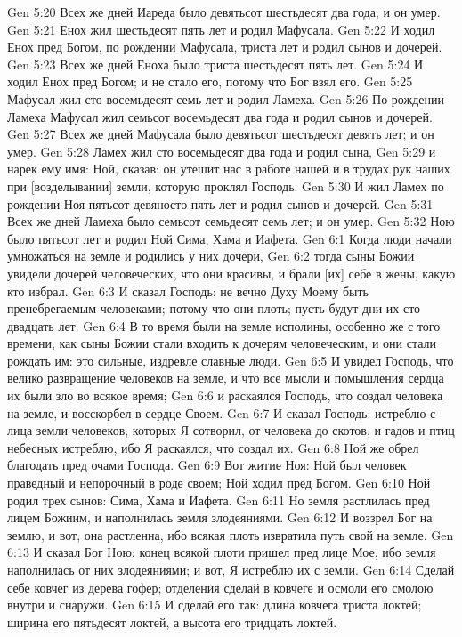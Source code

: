 Gen 5:20  Всех же дней Иареда было девятьсот шестьдесят два года; и он умер.
Gen 5:21  Енох жил шестьдесят пять лет и родил Мафусала.
Gen 5:22  И ходил Енох пред Богом, по рождении Мафусала, триста лет и родил сынов и дочерей.
Gen 5:23  Всех же дней Еноха было триста шестьдесят пять лет.
Gen 5:24  И ходил Енох пред Богом; и не стало его, потому что Бог взял его.
Gen 5:25  Мафусал жил сто восемьдесят семь лет и родил Ламеха.
Gen 5:26  По рождении Ламеха Мафусал жил семьсот восемьдесят два года и родил сынов и дочерей.
Gen 5:27  Всех же дней Мафусала было девятьсот шестьдесят девять лет; и он умер.
Gen 5:28  Ламех жил сто восемьдесят два года и родил сына,
Gen 5:29  и нарек ему имя: Ной, сказав: он утешит нас в работе нашей и в трудах рук наших при [возделывании] земли, которую проклял Господь.
Gen 5:30  И жил Ламех по рождении Ноя пятьсот девяносто пять лет и родил сынов и дочерей.
Gen 5:31  Всех же дней Ламеха было семьсот семьдесят семь лет; и он умер.
Gen 5:32  Ною было пятьсот лет и родил Ной Сима, Хама и Иафета.
Gen 6:1  Когда люди начали умножаться на земле и родились у них дочери,
Gen 6:2  тогда сыны Божии увидели дочерей человеческих, что они красивы, и брали [их] себе в жены, какую кто избрал.
Gen 6:3  И сказал Господь: не вечно Духу Моему быть пренебрегаемым человеками; потому что они плоть; пусть будут дни их сто двадцать лет.
Gen 6:4  В то время были на земле исполины, особенно же с того времени, как сыны Божии стали входить к дочерям человеческим, и они стали рождать им: это сильные, издревле славные люди.
Gen 6:5  И увидел Господь, что велико развращение человеков на земле, и что все мысли и помышления сердца их были зло во всякое время;
Gen 6:6  и раскаялся Господь, что создал человека на земле, и восскорбел в сердце Своем.
Gen 6:7  И сказал Господь: истреблю с лица земли человеков, которых Я сотворил, от человека до скотов, и гадов и птиц небесных истреблю, ибо Я раскаялся, что создал их.
Gen 6:8  Ной же обрел благодать пред очами Господа.
Gen 6:9  Вот житие Ноя: Ной был человек праведный и непорочный в роде своем; Ной ходил пред Богом.
Gen 6:10  Ной родил трех сынов: Сима, Хама и Иафета.
Gen 6:11  Но земля растлилась пред лицем Божиим, и наполнилась земля злодеяниями.
Gen 6:12  И воззрел Бог на землю, и вот, она растленна, ибо всякая плоть извратила путь свой на земле.
Gen 6:13  И сказал Бог Ною: конец всякой плоти пришел пред лице Мое, ибо земля наполнилась от них злодеяниями; и вот, Я истреблю их с земли.
Gen 6:14  Сделай себе ковчег из дерева гофер; отделения сделай в ковчеге и осмоли его смолою внутри и снаружи.
Gen 6:15  И сделай его так: длина ковчега триста локтей; ширина его пятьдесят локтей, а высота его тридцать локтей.
